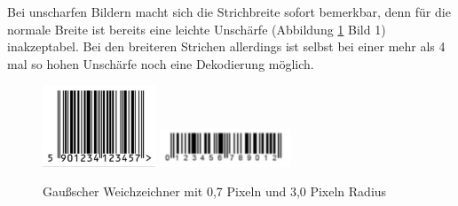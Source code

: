 Bei unscharfen Bildern macht sich die Strichbreite sofort bemerkbar, denn für die normale Breite ist bereits eine leichte Unschärfe (Abbildung \ref*{fig:eanblurry} Bild 1) inakzeptabel. Bei den breiteren Strichen allerdings ist selbst bei einer mehr als 4 mal so hohen Unschärfe noch eine Dekodierung möglich.
\begin{figure}[H]
  \centering
  \includegraphics[width=0.30\textwidth]{img/EAN13/blurry_01_07.jpg}
  \includegraphics[width=0.35\textwidth]{img/EAN13/blurry_02_3.jpg}
  \caption{Gaußscher Weichzeichner mit 0,7 Pixeln und 3,0 Pixeln Radius}
  \label{fig:eanblurry}
\end{figure}

